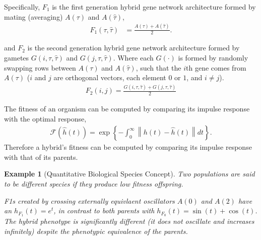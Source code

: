 \documentclass[9 pt]{article}
\newcommand{\1}{\mathbbm{1}}
\newtheorem{example}{Example}
\begin{document}
\begin{multicols}{2}
      Specifically, $F_{1}$ is the first generation hybrid gene network architecture formed by mating (averaging) $A(\tau)$ and $A(\hat{\tau})$, 
      \begin{align}
        F_{1}(\tau, \hat{\tau}) &= \frac{ A(\tau) + A(\hat{\tau}) }{2}  .
      \end{align}

      and $F_{2}$ is the second generation hybrid gene network architecture formed by gametes $G(i, \tau, \hat{\tau} )$ and $G(j, \tau, \hat{\tau})$. Where each $G(\cdot)$ is formed by randomly swapping rows between $A(\tau)$ and $A(\hat{\tau})$, such that the $i$th  gene comes from $A(\tau)$ ($i$ and $j$ are orthogonal vectors, each element $0$ or $1$, and $i \neq j$).
      \begin{align}
        F_{2}(i, j) = \frac{G (i, \tau, \hat{\tau} ) + G( j, \tau, \hat{\tau} )}{2}
      \end{align}


      The fitness of an organism can be computed by comparing its impulse response with the optimal response,
      \begin{align}
        \mathcal{F}\left( \widehat{h}(t) \right) = \exp \left\{- \int_{0}^{\infty} \left\lVert h(t) - \widehat{h}(t) \right\rVert dt \right\}  .
      \end{align}
      Therefore a hybrid's fitness can be computed by comparing its impulse response with that of its parents.

      \begin{example}[Quantitative Biological Species Concept]
        Two populations are said to be different species if they produce low fitness offspring.
        
        F1s created by crossing externally equivlaent oscillators $A(0)$ and $A(2)$ have an $h_{F_{1}}(t) = e^{t}$, in contrast to both parents with $h_{F_{0}}(t) = \sin(t) + \cos(t)$. The hybrid phenotype is significantly different (it does not oscillate and increases infinitely) despite the phenotypic equivalence of the parents.


\end{example}
\end{multicols}
\end{document}
